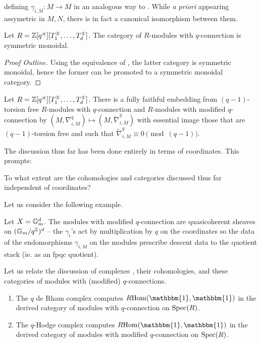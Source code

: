 defining $\gamma_{i,M}:M\to M$ in an analogous way to . While \emph{a priori} appearing assymetric in $M,N$, there is in fact a canonical isomorphism between them. 
\begin{proposition}
    Let $R=\mathbb{Z}[q^{\pm}][T_{1}^{\pm},\dots,T_{d}^{\pm}]$. The category of $R$-modules with $q$-connection is symmetric monoidal. 
\end{proposition}
\begin{proof}[Proof Outline]
    Using the equivalence of , the latter category is symmetric monoidal, hence the former can be promoted to a symmetric monoidal category. 
\end{proof}
\begin{proposition}
    Let $R=\mathbb{Z}[q^{\pm}][T_{1}^{\pm},\dots,T_{d}^{\pm}]$. There is a fully faithful embedding from $(q-1)$-torsion free $R$-modules with $q$-connection and $R$-modules with modified $q$-connection by $(M,\nabla_{i,M}^{q})\mapsto(M,\widetilde{\nabla}_{i,M}^{q})$ with essential image those that are $(q-1)$-torsion free and such that $\widetilde{\nabla}_{i,M}^{q}\equiv0\pmod{(q-1)}$. 
\end{proposition}
The discussion thus far has been done entirely in terms of coordinates. This prompts:
\begin{question}
    To what extent are the cohomologies and categories discussed thus far independent of coordinates? 
\end{question}
Let us consider the following example. 
\begin{example}
    Let $X=\mathbb{G}_{m}^{d}$. The modules with modified $q$-connection are quasicoherent sheaves on $(\mathbb{G}_{m}/q^{\mathbb{Z}})^{d}$ -- the $\gamma_{i}$'s act by multiplication by $q$ on the coordinates so the data of the endomorphisms $\gamma_{i,M}$ on the modules prescribe descent data to the quotient stack (ie. as an fpqc quotient).
\end{example}
Let us relate the discussion of complexes , their cohomologies, and these categories of modules with (modified) $q$-connections. 
\begin{proposition}
    \begin{enumerate}[label=(\roman*)]
        \item The $q$ de Rham complex computes $R\Hom(\mathbbm{1},\mathbbm{1})$ in the derived category of modules with $q$-connection on $\operatorname{Spec}(R)$. 
        \item The $q$-Hodge complex computes $R\Hom(\mathbbm{1},\mathbbm{1})$ in the derived category of modules with modified $q$-connection on $\operatorname{Spec}(R)$. 
    \end{enumerate}
\end{proposition}
